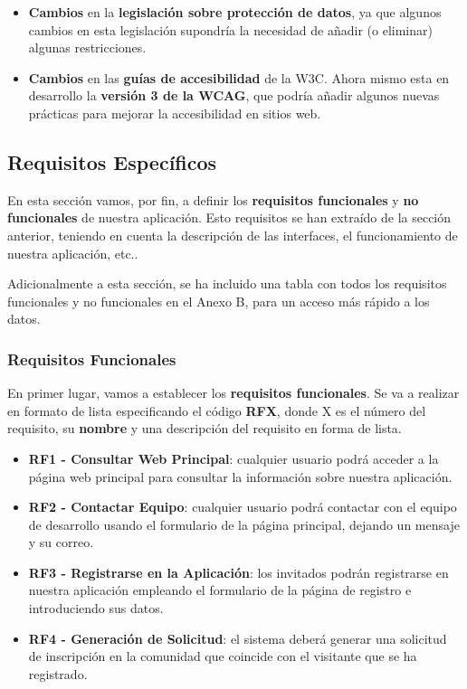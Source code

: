 \begin{itemize}
	\item \textbf{Cambios} en la \textbf{legislación sobre protección de datos}, ya que algunos cambios en esta legislación supondría la necesidad de añadir (o eliminar) algunas restricciones.
	
	\item \textbf{Cambios} en las \textbf{guías de accesibilidad} de la W3C. Ahora mismo esta en desarrollo la \textbf{versión 3 de la WCAG}, que podría añadir algunos nuevas prácticas para mejorar la accesibilidad en sitios web.
\end{itemize}


\subsection{Requisitos Específicos}
En esta sección vamos, por fin, a definir los \textbf{requisitos funcionales} y \textbf{no funcionales} de nuestra aplicación. Esto requisitos se han extraído de la sección anterior, teniendo en cuenta la descripción de las interfaces, el funcionamiento de nuestra aplicación, etc..

Adicionalmente a esta sección, se ha incluido una tabla con todos los requisitos funcionales y no funcionales en el Anexo B, para un acceso más rápido a los datos.

\subsubsection{Requisitos Funcionales}
En primer lugar, vamos a establecer los \textbf{requisitos funcionales}. Se va a realizar en formato de lista especificando el código \textbf{RFX}, donde X es el número del requisito, su \textbf{nombre} y una descripción del requisito en forma de lista. 

\begin{itemize}
	\item \textbf{RF1 - Consultar Web Principal}: cualquier usuario podrá acceder a la página web principal para consultar la información sobre nuestra aplicación.
	\item \textbf{RF2 - Contactar Equipo}: cualquier usuario podrá contactar con el equipo de desarrollo usando el formulario de la página principal, dejando un mensaje y su correo.
	\item \textbf{RF3 - Registrarse en la Aplicación}: los invitados podrán registrarse en nuestra aplicación empleando el formulario de la página de registro e introduciendo sus datos.
	\item \textbf{RF4 - Generación de Solicitud}: el sistema deberá generar una solicitud de inscripción en la comunidad que coincide con el visitante que se ha registrado.
\end{itemize}






